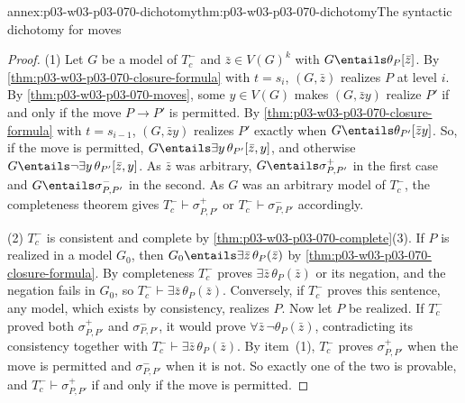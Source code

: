 \begin{annexitem}{annex:p03-w03-p03-070-dichotomy}{thm:p03-w03-p03-070-dichotomy}{The syntactic dichotomy for moves}
\begin{proof}
(1) Let \(G\) be a model of \(T^-_c\) and \(\bar z\in V(G)^k\) with
\(G\entails\theta_P[\bar z]\).  By
\cref{thm:p03-w03-p03-070-closure-formula} with \(t=s_i\), \((G,\bar z)\)
realizes \(P\) at level \(i\).  By \cref{thm:p03-w03-p03-070-moves}, some
\(y\in V(G)\) makes \((G,\bar zy)\) realize \(P'\) if and only if the move
\(P\to P'\) is permitted.  By \cref{thm:p03-w03-p03-070-closure-formula} with
\(t=s_{i-1}\), \((G,\bar zy)\) realizes \(P'\) exactly when
\(G\entails\theta_{P'}[\bar zy]\).  So, if the move is permitted,
\(G\entails\exists y\,\theta_{P'}[\bar z,y]\), and otherwise
\(G\entails\neg\exists y\,\theta_{P'}[\bar z,y]\).  As \(\bar z\) was arbitrary,
\(G\entails\sigma^+_{P,P'}\) in the first case and
\(G\entails\sigma^-_{P,P'}\) in the second.  As \(G\) was an arbitrary model
of \(T^-_c\), the completeness theorem gives
\(T^-_c\vdash\sigma^+_{P,P'}\) or \(T^-_c\vdash\sigma^-_{P,P'}\)
accordingly.

(2) \(T^-_c\) is consistent and complete by
\cref{thm:p03-w03-p03-070-complete}(3).  If \(P\) is realized in a model
\(G_0\), then \(G_0\entails\exists\bar z\,\theta_P(\bar z)\) by
\cref{thm:p03-w03-p03-070-closure-formula}.  By completeness \(T^-_c\) proves
\(\exists\bar z\,\theta_P(\bar z)\) or its negation, and the negation fails in
\(G_0\), so \(T^-_c\vdash\exists\bar z\,\theta_P(\bar z)\).  Conversely, if
\(T^-_c\) proves this sentence, any model, which exists by consistency,
realizes \(P\).  Now let \(P\) be realized.  If \(T^-_c\) proved both
\(\sigma^+_{P,P'}\) and \(\sigma^-_{P,P'}\), it would prove
\(\forall\bar z\,\neg\theta_P(\bar z)\), contradicting its consistency
together with \(T^-_c\vdash\exists\bar z\,\theta_P(\bar z)\).  By item~(1),
\(T^-_c\) proves \(\sigma^+_{P,P'}\) when the move is permitted and
\(\sigma^-_{P,P'}\) when it is not.  So exactly one of the two is provable,
and \(T^-_c\vdash\sigma^+_{P,P'}\) if and only if the move is permitted.
\end{proof}
\end{annexitem}

